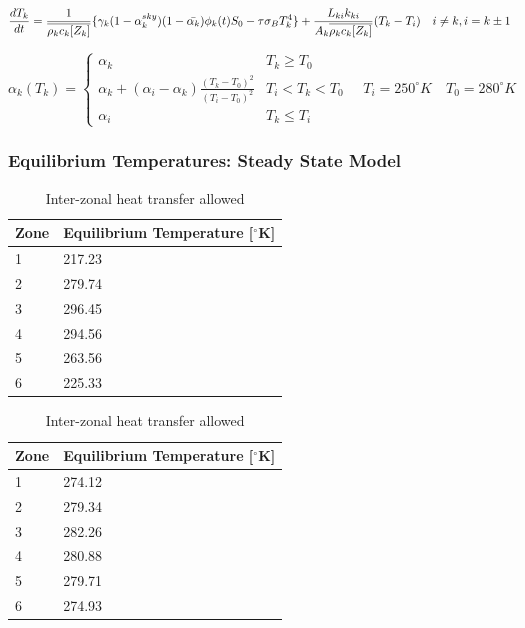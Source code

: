 \documentclass{article}
\newcommand*\mean[1]{\overline{#1}}
\begin{document}
\begin{appendices}
\begin{equation}
    \frac{dT_k}{dt} = \frac{1}{\mean{\rho_kc_k[Z_k]}}\{\gamma_k(1-\alpha_k^{sky})(1-\Bar{\alpha_k})\phi_k(t)S_0-\tau\sigma_BT_k^{4}\} + \frac{L_{ki}k_{ki}}{{A_k}\mean{\rho_kc_k[Z_k]}}(T_{k}-T_{i})
    \quad i \neq k, i = k \pm 1
    \label{eqn:dtkphi}
\end{equation}

\begin{equation}
  \alpha_k(T_k) =
    \begin{cases}
    \alpha_k & T_k \geq T_0 \\
    \alpha_k + (\alpha_i-\alpha_k)\frac{(T_k-T_0)^2}{(T_i-T_0)^2} & T_i < T_k < T_0 \\
    \alpha_i & T_k \leq T_i
    \end{cases}
    \quad T_i = 250^{\circ}K \quad T_0 = 280^{\circ}K
    \label{eqn:albedoparam}
\end{equation}

\subsubsection{Equilibrium Temperatures: Steady State Model}
\begin{table}[H]
    \parbox{.45\linewidth}{
    \captionsetup{singlelinecheck = false, justification=justified}
    \caption{Inter-zonal heat transfer suppressed}
    \begin{tabular}{ll}
    \hline
    Zone & Equilibrium Temperature [$^{\circ}$K] \\
    \hline
    1 & 217.23 \\
    2 & 279.74 \\
    3 & 296.45 \\
    4 & 294.56 \\ 
    5 & 263.56 \\
    6 & 225.33 \\
    \end{tabular}
    \label{tab:supressedteq}
    }
\hfill
    \parbox{.45\linewidth}{
    \captionsetup{singlelinecheck = false, justification=justified}
    \caption{Inter-zonal heat transfer allowed}
    \begin{tabular}{ll}
    \hline
    Zone & Equilibrium Temperature [$^{\circ}$K] \\
    \hline
    1 & 274.12 \\
    2 & 279.34 \\
    3 & 282.26 \\
    4 & 280.88 \\ 
    5 & 279.71 \\
    6 & 274.93 \\
    \end{tabular}
    \label{tab:teq}
    }
\end{table}
\FloatBarrier


\end{appendices}
\end{document}
